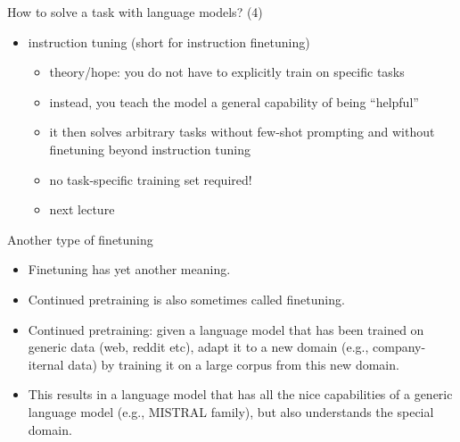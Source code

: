 \begin{frame}{How to solve a task with language models? (4)}

\vfill

\begin{itemize}
\item instruction tuning (short for instruction finetuning)
        \begin{itemize}
            \item theory/hope: you do not have to explicitly
            train on specific tasks
            \item instead, you teach the model a general
            capability of being ``helpful''
            \item it then solves arbitrary tasks without few-shot
            prompting and without finetuning beyond instruction tuning
            \item no task-specific training set required!
            \item next lecture
        \end{itemize}
\end{itemize}

\vfill

\end{frame}



\begin{frame}{Another type of finetuning}

\vfill

\begin{itemize}
    \item Finetuning has yet another meaning.
    \item Continued pretraining is also sometimes called
    finetuning.
    \item Continued pretraining: given a language model
that has been    trained on generic data (web, reddit etc),
    adapt it to a new domain (e.g., company-iternal data) by
    training it on a large corpus from this new domain.
    \item This results in a language model that has all the
    nice capabilities of a generic language model (e.g.,
    MISTRAL family), but also understands the special domain.
\end{itemize}

\vfill

\end{frame}

